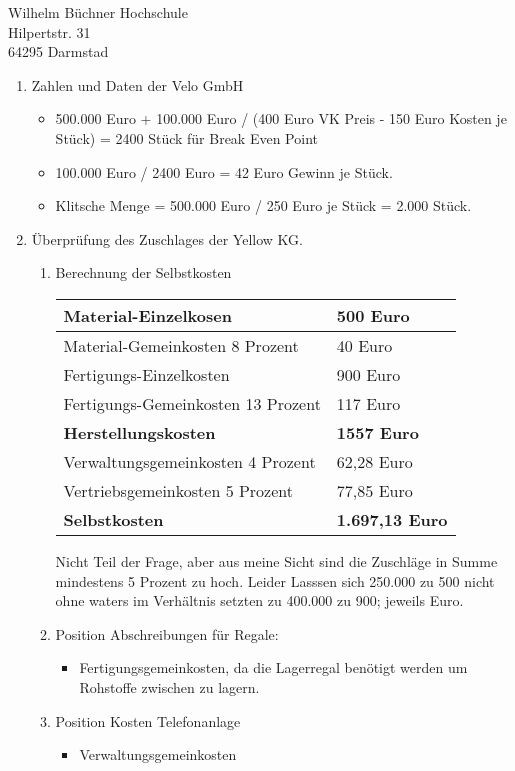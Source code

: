\documentclass[
    version=last,           %
    DIV=13,                 %
    BCOR=0mm,               %
    paper=a4,               %
    fontsize=12pt,          %
    firsthead=on,           %
    firstfoot=on,           %
    pagenumber=on,i         %
    parskip=half,           %
    enlargefirstpage=,      %
    firsthead=on,           %
    fromrule=afteraddress,  %
    priority=off,           %
    backaddress=true,       %
    refline=dateright,      %
	fromalign=right,	    %
    fromemail=on,i          %
    fromurl=on,             %
    frombank=on,
    fromphone=on,           %
    frommobilephone=on      %
    fromlogo=on,            %
    addrfield=on,           %
    subject=untitled,  %
    foldmarks=off,          %
    numericaldate=off,      %
	pagenumber=right,	        %
	parskip=half,	        %
    headsep=false,          %
    footsepline=true,       %
    foldmarks=off,		    %
	]{scrlttr2}
\begin{document}
\begin{letter} {Wilhelm Büchner Hochschule \\
Hilpertstr. 31\\
64295 Darmstad}
\begin{enumerate}
    \item Zahlen und Daten der Velo GmbH
        \begin{itemize}
            \item 500.000 Euro + 100.000 Euro / (400 Euro VK Preis - 150
                Euro Kosten je Stück) = 2400 Stück für Break Even Point
            \item 100.000 Euro / 2400 Euro = 42 Euro Gewinn je Stück.
            \item Klitsche Menge = 500.000 Euro / 250 Euro je Stück =
                2.000 Stück.
        \end{itemize}
    \item Überprüfung des Zuschlages der Yellow KG.
        \begin{enumerate}
            \item Berechnung der Selbstkosten \newline
            \begin{tabular}{ |l|l| }
                    \hline Material-Einzelkosen & 500 Euro \\
                    \hline Material-Gemeinkosten 8 Prozent & 40 Euro \\
                    \hline Fertigungs-Einzelkosten & 900 Euro \\
                    \hline Fertigungs-Gemeinkosten 13 Prozent & 117 Euro \\
                    \hline \textbf{Herstellungskosten} & \textbf{1557 Euro} \\
                    \hline Verwaltungsgemeinkosten 4 Prozent & 62,28 Euro \\
                    \hline Vertriebsgemeinkosten 5 Prozent &  77,85 Euro \\
                    \hline \textbf{Selbstkosten} & \textbf{1.697,13 Euro} \\
                    \hline
            \end{tabular}

                    Nicht Teil der Frage, aber aus meine Sicht sind die
                    Zuschläge in Summe mindestens 5 Prozent zu hoch. Leider
                    Lasssen sich 250.000 zu 500 nicht ohne waters im Verhältnis
                    setzten zu 400.000 zu 900; jeweils Euro.

                \item Position Abschreibungen für Regale:
                    \begin{itemize}
                        \item Fertigungsgemeinkosten, da die Lagerregal benötigt werden
                            um Rohstoffe zwischen zu lagern.
                    \end{itemize}
                \item Position Kosten Telefonanlage
                    \begin{itemize}
                        \item  Verwaltungsgemeinkosten
                    \end{itemize}


\end{enumerate}
\end{enumerate}
\end{letter}
\end{document}
